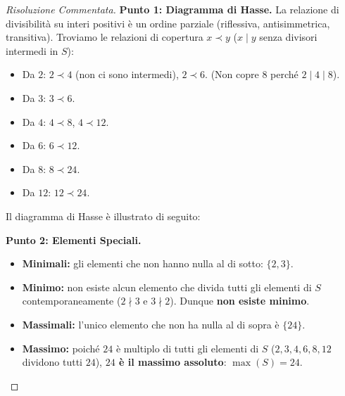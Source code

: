 \begin{proof}[Risoluzione Commentata]
\textbf{Punto 1: Diagramma di Hasse.}
La relazione di divisibilità su interi positivi è un ordine parziale (riflessiva, antisimmetrica, transitiva).
Troviamo le relazioni di copertura $x \prec y$ ($x \mid y$ senza divisori intermedi in $S$):
\begin{itemize}
    \item Da $2$: $2 \prec 4$ (non ci sono intermedi), $2 \prec 6$. (Non copre $8$ perché $2 \mid 4 \mid 8$).
    \item Da $3$: $3 \prec 6$.
    \item Da $4$: $4 \prec 8$, $4 \prec 12$.
    \item Da $6$: $6 \prec 12$.
    \item Da $8$: $8 \prec 24$.
    \item Da $12$: $12 \prec 24$.
\end{itemize}

Il diagramma di Hasse è illustrato di seguito:

\begin{center}
\end{center}

\textbf{Punto 2: Elementi Speciali.}
\begin{itemize}
    \item \textbf{Minimali:} gli elementi che non hanno nulla al di sotto: $\{2, 3\}$.
    \item \textbf{Minimo:} non esiste alcun elemento che divida tutti gli elementi di $S$ contemporaneamente ($2 \nmid 3$ e $3 \nmid 2$). Dunque \textbf{non esiste minimo}.
    \item \textbf{Massimali:} l'unico elemento che non ha nulla al di sopra è $\{24\}$.
    \item \textbf{Massimo:} poiché $24$ è multiplo di tutti gli elementi di $S$ ($2, 3, 4, 6, 8, 12$ dividono tutti $24$), \textbf{$24$ è il massimo assoluto}: $\max(S) = 24$.
\end{itemize}


\end{proof}
